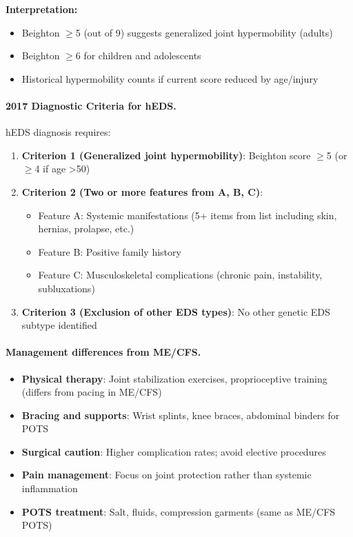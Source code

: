 \begin{observation}
\textbf{Interpretation:}
\begin{itemize}
    \item Beighton $\geq$5 (out of 9) suggests generalized joint hypermobility (adults)
    \item Beighton $\geq$6 for children and adolescents
    \item Historical hypermobility counts if current score reduced by age/injury
\end{itemize}

\paragraph{2017 Diagnostic Criteria for hEDS.}

hEDS diagnosis requires:
\begin{enumerate}
    \item \textbf{Criterion 1 (Generalized joint hypermobility)}: Beighton score $\geq$5 (or $\geq$4 if age >50)
    \item \textbf{Criterion 2 (Two or more features from A, B, C)}:
    \begin{itemize}
        \item Feature A: Systemic manifestations (5+ items from list including skin, hernias, prolapse, etc.)
        \item Feature B: Positive family history
        \item Feature C: Musculoskeletal complications (chronic pain, instability, subluxations)
    \end{itemize}
    \item \textbf{Criterion 3 (Exclusion of other EDS types)}: No other genetic EDS subtype identified
\end{enumerate}

\paragraph{Management differences from ME/CFS.}
\begin{itemize}
    \item \textbf{Physical therapy}: Joint stabilization exercises, proprioceptive training (differs from pacing in ME/CFS)
    \item \textbf{Bracing and supports}: Wrist splints, knee braces, abdominal binders for POTS
    \item \textbf{Surgical caution}: Higher complication rates; avoid elective procedures
    \item \textbf{Pain management}: Focus on joint protection rather than systemic inflammation
    \item \textbf{POTS treatment}: Salt, fluids, compression garments (same as ME/CFS POTS)
\end{itemize}


\end{observation}
